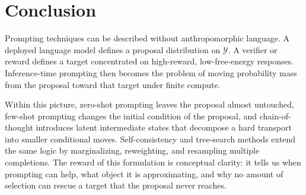 \documentclass[aps,pre,reprint,superscriptaddress,nofootinbib]{revtex4-2}
\newcommand{\cY}{\mathcal{Y}}
\begin{document}
\section{Conclusion}

Prompting techniques can be described without anthropomorphic language.
 A deployed language model defines a proposal distribution on $\cY$.
 A verifier or reward defines a target concentrated on high-reward, low-free-energy responses.
 Inference-time prompting then becomes the problem of moving probability mass from the proposal toward that target under finite compute.

Within this picture, zero-shot prompting leaves the proposal almost untouched, few-shot prompting changes the initial condition of the proposal, and chain-of-thought introduces latent intermediate states that decompose a hard transport into smaller conditional moves.
 Self-consistency and tree-search methods extend the same logic by marginalizing, reweighting, and resampling multiple completions.
 The reward of this formulation is conceptual clarity: it tells us when prompting can help, what object it is approximating, and why no amount of selection can rescue a target that the proposal never reaches.



\end{document}
